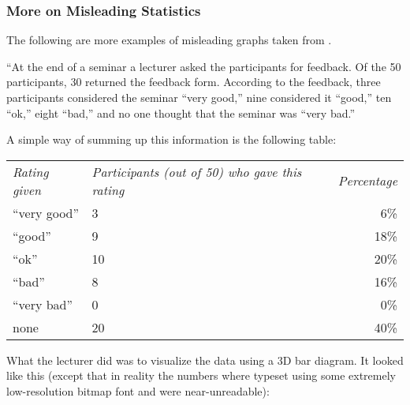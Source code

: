 \subsubsection*{More on Misleading Statistics}
The following are more examples of misleading graphs taken from \textcite[Chapter 7]{tantau}.
\begin{example}
\Item
\begin{Quote}
``At the
end of a seminar a lecturer asked the participants for feedback. Of
the 50 participants, 30 returned the feedback form. According to the
feedback, three participants considered the seminar ``very good,''
nine considered it  ``good,'' ten ``ok,'' eight ``bad,'' and no one thought
that the seminar was ``very bad.''

A simple way of summing up this information is the following table:

\medskip
\begin{tabular}{lp{3.75cm}r}
  \emph{Rating given} & \raggedright\emph{Participants (out of 50) who gave this rating} &
  \emph{Percentage} \\[1.75em]
  ``very good'' & \hfil\hphantom{0}3\hfil & \hphantom{0}6\% \\
  ``good'' & \hfil\hphantom{0}9\hfil & 18\% \\
  ``ok'' & \hfil10\hfil & 20\% \\
  ``bad'' & \hfil\hphantom{0}8\hfil & 16\% \\
  ``very bad'' & \hfil\hphantom{0}0\hfil & \hphantom{0}0\% \\[2mm]
  none & \hfil20\hfil & 40\% \\
\end{tabular}

\bigskip
What the lecturer did was to visualize the data using a 3D bar
diagram. It looked like this (except that in reality the numbers
where typeset using some extremely low-resolution bitmap font and
were near-unreadable):

\bigskip
\par
{}
\end{Quote}
\end{example}
